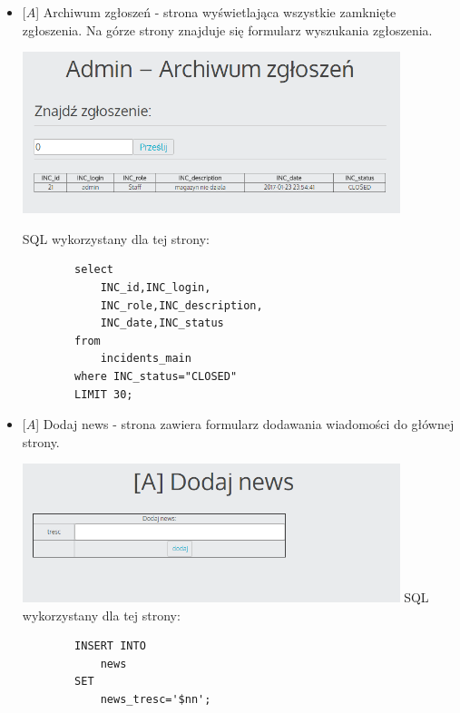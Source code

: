 \documentclass[10pt,a4paper]{article}
\begin{document}
\begin{itemize}
		SQL wykorzystany dla tej strony:
		\begin{lstlisting}
		select 
			INC_id as Numer, 
			INC_description as Opis, 
			INC_date as Data, 
			INC_status as Status 
		from 
			incidents_main 
		where 
			INC_id='. $ticket . ';
		---------------------------------------------------
		SELECT 
			b.incidents_log_time as Data, 
			b.incidents_log_text as Aktualizacja, 
			b.incidents_log_user as Użytkownik 
		FROM 
			incidents_main a 
		INNER JOIN 
			incidents_log b 
			ON a.INC_id=b.incidents_log_ticket 
		where 
			a.INC_id='. $ticket . ' 
		order by 
			b.incidents_log_time ASC; 
		---------------------------------------------------
		INSERT INTO 
			incidents_log 
		SET 
			incidents_log_user='$login', 
			incidents_log_text='$ticket_desc', 
			incidents_log_ticket='$ticket', 
			incidents_log_time='$created_date' 
		---------------------------------------------------
		UPDATE 
			incidents_main 
		SET 
			INC_status = '$ticket_desc_status' 
		where 
			INC_id='$ticket'
		\end{lstlisting}
		
		
		\item $[A$] Archiwum zgłoszeń - strona wyświetlająca wszystkie zamknięte zgłoszenia. Na górze strony znajduje się formularz wyszukania zgłoszenia.
		
	\includegraphics[width=11cm]{12}
		
		SQL wykorzystany dla tej strony:
		\begin{lstlisting}
		select 
			INC_id,INC_login,
			INC_role,INC_description,
			INC_date,INC_status 
		from 
			incidents_main 
		where INC_status="CLOSED" 
		LIMIT 30;
		\end{lstlisting}
		
		\item $[A$] Dodaj news - strona zawiera formularz dodawania wiadomości do głównej strony. 
		
		\includegraphics[width=11cm]{13}
		\newpage
			SQL wykorzystany dla tej strony:
		\begin{lstlisting}
		INSERT INTO 
			news 
		SET 
			news_tresc='$nn'; 
		\end{lstlisting}
		

\end{itemize}
\end{document}

